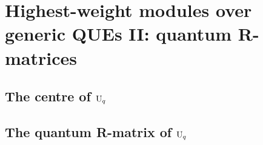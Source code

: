 \section{Highest-weight modules over generic QUEs II: quantum R-matrices}
    \subsection{The centre of \texorpdfstring{$\mathrm{U}_q$}{}}

    \subsection{The quantum R-matrix of \texorpdfstring{$\mathrm{U}_q$}{}}